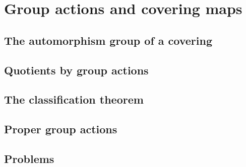 \chapter{Group actions and covering maps}
\section{The automorphism group of a covering}
\section{Quotients by group actions}
\section{The classification theorem}
\section{Proper group actions}
\section{Problems}

